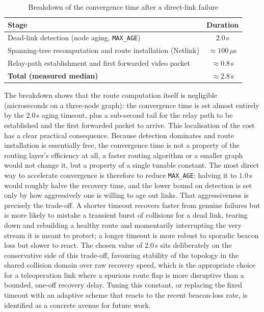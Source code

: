 \vspace{0.4cm}
\begin{table}[h]
\centering
\caption{Breakdown of the convergence time after a direct-link failure}
\label{tab:conv-breakdown}
\begin{tabular}{lc}
\toprule
\textbf{Stage} & \textbf{Duration} \\
\midrule
Dead-link detection (node aging, \texttt{MAX\_AGE}) & $2.0$\,s \\
Spanning-tree recomputation and route installation (Netlink) & $\approx 100\,\mu$s \\
Relay-path establishment and first forwarded video packet & $\approx 0.8$\,s \\
\midrule
\textbf{Total (measured median)} & $\approx 2.8$\,s \\
\bottomrule
\end{tabular}
\end{table}
\vspace{0.5cm}

The breakdown shows that the route computation itself is negligible
(microseconds on a three-node graph): the convergence time is set almost
entirely by the $2.0$\,s aging timeout, plus a sub-second tail for the relay
path to be established and the first forwarded packet to arrive. This
localisation of the cost has a clear practical consequence. Because detection
dominates and route installation is essentially free, the convergence time is
not a property of the routing layer's efficiency at all, a faster routing
algorithm or a smaller graph would not change it, but a property of a single
tunable constant. The most direct way to accelerate convergence is therefore to
reduce \texttt{MAX\_AGE}: halving it to $1.0$\,s would roughly halve the
recovery time, and the lower bound on detection is set only by how aggressively
one is willing to age out links. That aggressiveness is precisely the trade-off.
A shorter timeout recovers faster from genuine failures but is more likely to
mistake a transient burst of collisions for a dead link, tearing down and
rebuilding a healthy route and momentarily interrupting the very stream it is
meant to protect; a longer timeout is more robust to sporadic beacon loss but
slower to react. The chosen value of $2.0$\,s sits deliberately on the
conservative side of this trade-off, favouring stability of the topology in the
shared collision domain over raw recovery speed, which is the appropriate
choice for a teleoperation link where a spurious route flap is more disruptive
than a bounded, one-off recovery delay. Tuning this constant, or replacing the
fixed timeout with an adaptive scheme that reacts to the recent beacon-loss
rate, is identified as a concrete avenue for future work.

